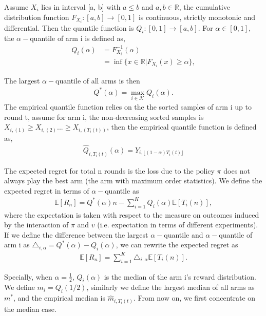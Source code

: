 \documentclass{article}
\theoremstyle{plain}
\begin{document}
    Assume $X_i$ lies in interval [a, b] with $a \leq b$ and $a, b \in \mathbb{R}$, the cumulative distribution function $F_{X_i}: [a, b] \rightarrow [0,1]$ is continuous, strictly monotonic and differential. Then the quantile function is $Q_{i}:  [0,1] \rightarrow [a,b]$. For $\alpha \in [0,1]$, the $\alpha-$quantile of arm i is defined as,
    \begin{align}
        Q_{i}(\alpha) &= F_{X_i}^{-1}(\alpha)\\
        &= \inf \{x \in \mathbb{R}| F_{X_i}(x) \geq \alpha\},
    \end{align}

The largest $\alpha-$quantile of all arms is then 
\begin{align}
    Q^\ast(\alpha) = \max_{i\in \mathcal{K}} Q_{i}(\alpha).
\end{align}
The empirical quantile function relies on the the sorted samples of arm i up to round t, assume for arm i, the non-decreasing sorted samples is $X_{i,(1)} \geq X_{i,(2)} ... \geq X_{i,(T_i(t))}$, then the empirical quantile function is defined as,
\begin{align}
    \hat{Q}_{i, T_i(t)}(\alpha) = Y_{i,\lfloor (1 - \alpha) T_i(t) \rfloor}
\end{align}


The expected regret for total n rounds is the loss due to the policy $\pi$ does not always play the best arm (the arm with maximum order statistics). We define the expected regret in terms of $\alpha-$quantile as 
\begin{align}
    \label{regret}
    \mathbb{E}[R_n] = Q^\ast(\alpha) n -  \sum_{i=1}^K Q_{i}(\alpha) \mathbb{E}[T_i(n)],
\end{align}
where the expectation is taken with respect to the measure on outcomes induced by the interaction of $\pi$ and $v$ (i.e. expectation in terms of different experiments). If we define the difference between the largest $\alpha-$quantile and $\alpha-$quantile of arm i as $\triangle_{i,\alpha} = Q^\ast(\alpha) - Q_{i}(\alpha)$, we can rewrite the expected regret as
\begin{align}
    \mathbb{E}[R_n] = \sum_{i = 1}^K \triangle_{i, \alpha} \mathbb{E}[T_i(n)].
\end{align}

Specially, when $\alpha = \frac{1}{2}$, $Q_i(\alpha)$ is the median of the arm i's reward distribution. We define $m_i = Q_i(1/2)$, similarly we define the largest median of all arms as $m^*$, and the empirical median is $\hat{m}_{i, T_i(t)}$. From now on, we first concentrate on the median case. 
\end{document}
